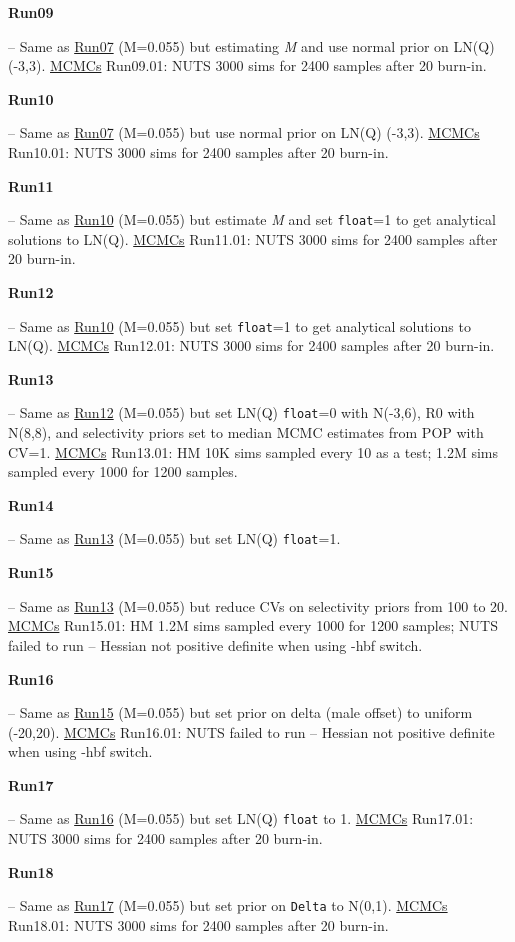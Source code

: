 \hypertarget{R09}{\textbf{Run09}} -- Same as \hyperlink{R07}{Run07} (M=0.055) but estimating \textit{M} and use normal prior on LN(Q) (-3,3). \underline{MCMCs} Run09.01: NUTS 3000 sims for 2400 samples after 20\pc{} burn-in.

\hypertarget{R10}{\textbf{Run10}} -- Same as \hyperlink{R07}{Run07} (M=0.055) but use normal prior on LN(Q) (-3,3). \underline{MCMCs} Run10.01: NUTS 3000 sims for 2400 samples after 20\pc{} burn-in.

\hypertarget{R11}{\textbf{Run11}} -- Same as \hyperlink{R10}{Run10} (M=0.055) but estimate \textit{M} and set \texttt{float}=1 to get analytical solutions to LN(Q). \underline{MCMCs} Run11.01: NUTS 3000 sims for 2400 samples after 20\pc{} burn-in.

\hypertarget{R12}{\textbf{Run12}} -- Same as \hyperlink{R10}{Run10} (M=0.055) but set \texttt{float}=1 to get analytical solutions to LN(Q). \underline{MCMCs} Run12.01: NUTS 3000 sims for 2400 samples after 20\pc{} burn-in.

\hypertarget{R13}{\textbf{Run13}} -- Same as \hyperlink{R12}{Run12} (M=0.055) but set LN(Q) \texttt{float}=0 with N(-3,6), R0 with N(8,8), and selectivity priors set to median MCMC estimates from POP with CV=1. \underline{MCMCs} Run13.01: HM 10K sims sampled every 10 as a test; 1.2M sims sampled every 1000 for 1200 samples.

\hypertarget{R14}{\textbf{Run14}} -- Same as \hyperlink{R13}{Run13} (M=0.055) but set LN(Q) \texttt{float}=1.

\hypertarget{R15}{\textbf{Run15}} -- Same as \hyperlink{R13}{Run13} (M=0.055) but reduce CVs on selectivity priors from 100\pc{} to 20\pc{}. \underline{MCMCs} Run15.01: HM 1.2M sims sampled every 1000 for 1200 samples;  NUTS failed to run  -- Hessian not positive definite when using -hbf switch.

\hypertarget{R16}{\textbf{Run16}} -- Same as \hyperlink{R15}{Run15} (M=0.055) but set prior on delta (male offset) to uniform (-20,20). \underline{MCMCs} Run16.01: NUTS failed to run  -- Hessian not positive definite when using -hbf switch.

\hypertarget{R17}{\textbf{Run17}} -- Same as \hyperlink{R16}{Run16} (M=0.055) but set LN(Q) \texttt{float} to 1. \underline{MCMCs} Run17.01: NUTS 3000 sims for 2400 samples after 20\pc{} burn-in.

\hypertarget{R18}{\textbf{Run18}} -- Same as \hyperlink{R17}{Run17} (M=0.055) but set prior on \texttt{Delta} to N(0,1). \underline{MCMCs} Run18.01: NUTS 3000 sims for 2400 samples after 20\pc{} burn-in.


